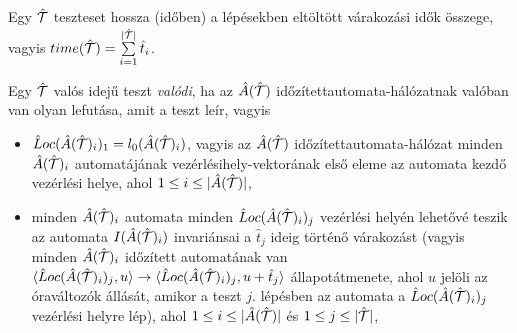 Egy $\hat{\mathcal{T}}$ teszteset hossza (időben) a lépésekben eltöltött várakozási idők összege, vagyis $time(\hat{\mathcal{T}}) = \sum\limits_{i = 1}^{|\hat{\mathcal{T}}|} \hat{t}_i$.

\begin{definition}
\label{ValódiTesztKiterjesztés}
Egy $\hat{\mathcal{T}}$ valós idejű teszt \emph{valódi}, ha az $\hat{A}(\hat{\mathcal{T}})$ időzítettautomata-hálózatnak valóban van olyan lefutása, amit a teszt leír, vagyis 
\begin{itemize}
    \item $\hat{L}oc(\hat{A}(\hat{\mathcal{T}})_i)_1 = l_0(\hat{A}(\hat{\mathcal{T}})_i)$, vagyis az $\hat{A}(\hat{\mathcal{T}})$ időzítettautomata-hálózat minden $\hat{A}(\hat{\mathcal{T}})_i$ automatájának vezérlésihely-vektorának első eleme az automata kezdő vezérlési helye, ahol $1 \leq i \leq |\hat{A}(\hat{\mathcal{T}})|$,
    \item minden $\hat{A}(\hat{\mathcal{T}})_i$ automata minden $\hat{L}oc(\hat{A}(\hat{\mathcal{T}})_i)_j$ vezérlési helyén lehetővé teszik az automata $I(\hat{A}(\hat{\mathcal{T}})_i)$ invariánsai a $\hat{t}_j$ ideig történő várakozást (vagyis minden $\hat{A}(\hat{\mathcal{T}})_i$ időzített automatának van $\langle \hat{L}oc(\hat{A}(\hat{\mathcal{T}})_i)_j, u \rangle \rightarrow \langle \hat{L}oc(\hat{A}(\hat{\mathcal{T}})_i)_j, u + \hat{t}_j \rangle$ állapotátmenete, ahol $u$ jelöli az óraváltozók állását, amikor a teszt $j.$ lépésben az automata a $\hat{L}oc(\hat{A}(\hat{\mathcal{T}})_i)_j$ vezérlési helyre lép), ahol $1 \leq i \leq |\hat{A}(\hat{\mathcal{T}})|$ és $1 \leq j \leq |\hat{\mathcal{T}}|$,

\end{itemize}
\end{definition}

